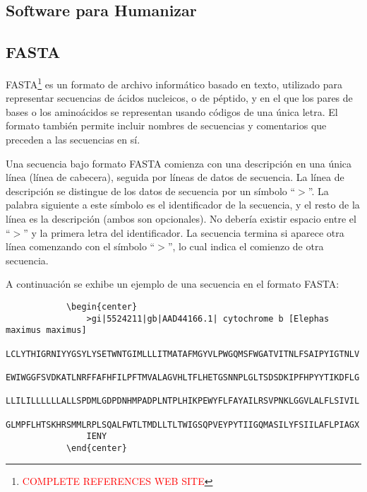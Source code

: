 \documentclass[12pt,a4paper,spanish]{article}
\begin{document}

	\subsection{Software para Humanizar}

	\subsection{FASTA}
		\par \textsc{FASTA}\footnote{\textcolor{red}{COMPLETE REFERENCES WEB SITE}} es un formato de archivo informático basado en texto, utilizado para representar secuencias de ácidos nucleicos, o de péptido, y en el que 		los pares de bases o los aminoácidos se representan usando códigos de una única letra. El formato también permite incluir nombres de secuencias y 			comentarios que preceden a las secuencias en sí.	

		\par Una secuencia bajo formato \textsc{FASTA} comienza con una descripción en una única línea (línea de cabecera), seguida por líneas de datos de 			secuencia. La línea de descripción se distingue de los datos de secuencia por un símbolo ``$>$''. La palabra siguiente a este símbolo es el 		identificador de la secuencia, y el resto de la línea es la descripción (ambos son opcionales). No debería existir espacio entre el ``$>$'' y la 			primera letra del identificador. La secuencia termina si aparece otra línea comenzando con el símbolo ``$>$'', lo cual indica el comienzo de otra 			secuencia. 
		\par A continuación se exhibe un ejemplo de una secuencia en el formato \textsc{FASTA}:
		\begin{verbatim}
			\begin{center}
				>gi|5524211|gb|AAD44166.1| cytochrome b [Elephas maximus maximus]
				LCLYTHIGRNIYYGSYLYSETWNTGIMLLLITMATAFMGYVLPWGQMSFWGATVITNLFSAIPYIGTNLV
				EWIWGGFSVDKATLNRFFAFHFILPFTMVALAGVHLTFLHETGSNNPLGLTSDSDKIPFHPYYTIKDFLG
				LLILILLLLLLALLSPDMLGDPDNHMPADPLNTPLHIKPEWYFLFAYAILRSVPNKLGGVLALFLSIVIL
				GLMPFLHTSKHRSMMLRPLSQALFWTLTMDLLTLTWIGSQPVEYPYTIIGQMASILYFSIILAFLPIAGX
				IENY
			\end{center}
		\end{verbatim}
\end{document}
